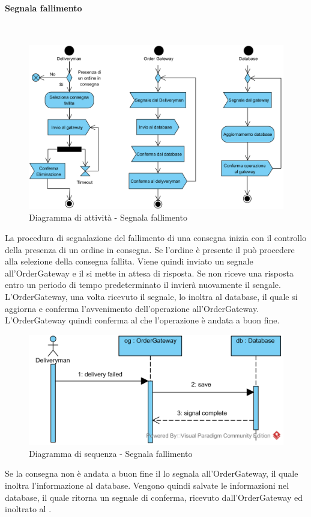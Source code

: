 \paragraph{Segnala fallimento}\mbox{}\\
\nopagebreak
\begin{figure}[H]
	\centering
	\includegraphics[width=14cm]{diagrammi_img/attivita/delivetyman_fallimento.png}
	\caption{Diagramma di attività - Segnala fallimento}
\end{figure}
La procedura di segnalazione del fallimento di una consegna inizia con il controllo della presenza di un ordine in consegna. Se l'ordine è presente il \Deliveryman{} può procedere alla selezione della consegna fallita. Viene quindi inviato un segnale all'OrderGateway e il \Deliveryman{} si mette in attesa di risposta. Se non riceve una risposta entro un periodo di tempo predeterminato il \Deliveryman{} invierà nuovamente il sengale. L'OrderGateway, una volta ricevuto il segnale, lo inoltra al database, il quale si aggiorna e conferma l'avvenimento dell'operazione all'OrderGateway. L'OrderGateway quindi conferma al \Deliveryman{} che l'operazione è andata a buon fine.

\begin{figure}[H]
	\centering
	\includegraphics[width=14cm]{../../documenti/SpecificaTecnica/diagrammi_img/sequenza/fattorino_fallimento_consegna.png}
	\caption{Diagramma di sequenza - Segnala fallimento}
\end{figure}
Se la consegna non è andata a buon fine il \Deliveryman{} lo segnala all'Order\-Gateway, il quale inoltra l'informazione al database. Vengono quindi salvate le informazioni nel database, il quale ritorna un segnale di conferma, ricevuto dall'Order\-Gateway ed inoltrato al \Deliveryman{}.


